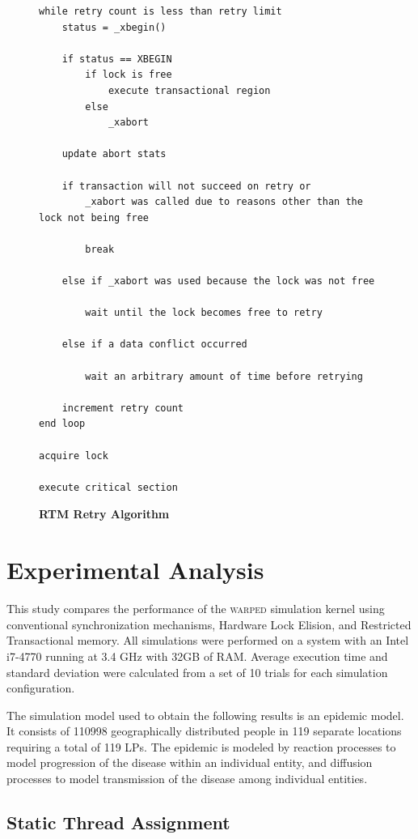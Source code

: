 \documentclass[11pt]{book}
\begin{document}
\begin{figure}
\begin{verbatim}
while retry count is less than retry limit
    status = _xbegin()

    if status == XBEGIN
        if lock is free
            execute transactional region
        else
            _xabort

    update abort stats

    if transaction will not succeed on retry or 
        _xabort was called due to reasons other than the lock not being free

        break

    else if _xabort was used because the lock was not free

        wait until the lock becomes free to retry

    else if a data conflict occurred
        
        wait an arbitrary amount of time before retrying

    increment retry count
end loop

acquire lock

execute critical section

\end{verbatim}
\caption{\textbf{RTM Retry Algorithm}}\label{rtm_retry}
\end{figure}


\chapter{Experimental Analysis}

This study compares the performance of the \textsc{warped} simulation kernel using conventional
synchronization mechanisms, Hardware Lock Elision, and Restricted Transactional memory.
All simulations were performed on a system with an Intel i7-4770 running at 3.4 GHz with
32GB of RAM.  Average execution time and standard deviation were calculated from a set of
10 trials for each simulation configuration.

The simulation model used to obtain the following results is an epidemic model.  It
consists of 110998 geographically distributed people in 119 separate locations requiring a
total of 119 LPs.  The epidemic is modeled by reaction processes to model progression of
the disease within an individual entity, and diffusion processes to model transmission of
the disease among individual entities.

\section{Static Thread Assignment}
\end{document}

